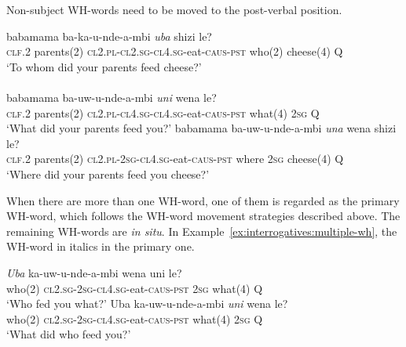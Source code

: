 Non-subject WH-words need to be moved to the post-verbal position.

\begin{exe}
\ex
{} babamama ba-ka-u-nde-\textipa{\textbeltl}a-mbi \textit{uba} shizi le? \\
\textsc{clf.2} parents(2) \textsc{cl2.pl}-\textsc{cl2.sg}-\textsc{cl4.sg}-eat-\textsc{caus}-\textsc{pst} who(2) cheese(4) Q \\
\trans `To whom did your parents feed cheese?' \\

\ 
\\

\ex
{} babamama ba-uw-u-nde-\textipa{\textbeltl}a-mbi \textit{uni} wena le? \\
\textsc{clf.2} parents(2) \textsc{cl2.pl}-\textsc{cl4.sg}-\textsc{cl4.sg}-eat-\textsc{caus}-\textsc{pst} what(4) \textsc{2sg} Q \\
\trans `What did your parents feed you?'
\ex
{} babamama ba-uw-u-nde-\textipa{\textbeltl}a-mbi \textit{una} wena shizi le? \\
\textsc{clf.2} parents(2) \textsc{cl2.pl}-\textsc{2sg}-\textsc{cl4.sg}-eat-\textsc{caus}-\textsc{pst} where \textsc{2sg} cheese(4) Q \\
\trans `Where did your parents feed you cheese?'
\end{exe}

When there are more than one WH-word, one of them is regarded as the primary WH-word, which follows the WH-word movement strategies described above. The remaining WH-words are \textit{in situ}. In Example~\ref{ex:interrogatives:multiple-wh}, the WH-word in italics in the primary one.

\begin{exe}
\ex
\begin{xlist}
\ex
\gll \textit{Uba} ka-uw-u-nde-\textipa{\textbeltl}a-mbi wena uni le? \\
who(2) \textsc{cl2.sg}-\textsc{2sg}-\textsc{cl4.sg}-eat-\textsc{caus}-\textsc{pst} \textsc{2sg} what(4) Q \\
\trans `Who fed you what?'
\ex
\gll Uba ka-uw-u-nde-\textipa{\textbeltl}a-mbi \textit{uni} wena le? \\
who(2) \textsc{cl2.sg}-\textsc{2sg}-\textsc{cl4.sg}-eat-\textsc{caus}-\textsc{pst} what(4) \textsc{2sg} Q \\
\trans `What did who feed you?'
\end{xlist}
\label{ex:interrogatives:multiple-wh}
\end{exe}
